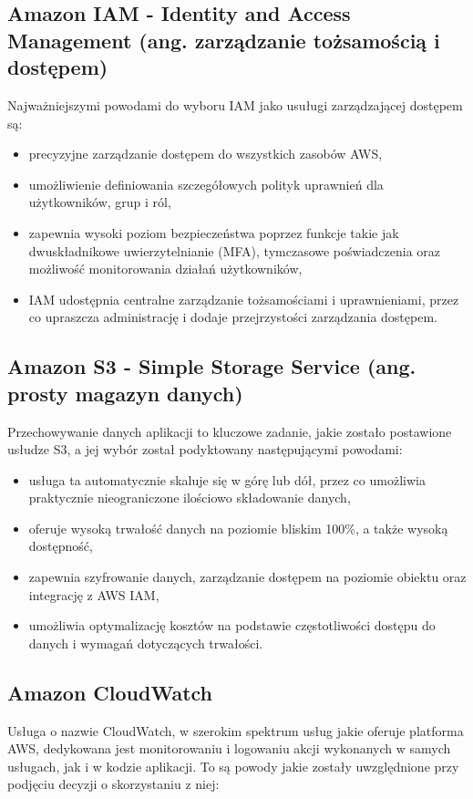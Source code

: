 \documentclass[12pt,twoside]{book}
\begin{document}
\subsection{Amazon IAM - Identity and Access Management (ang. zarządzanie tożsamością i dostępem)}
Najważniejszymi powodami do wyboru IAM jako usuługi zarządzającej dostępem są:

\begin{itemize}
\item precyzyjne zarządzanie dostępem do wszystkich zasobów AWS,
\item umożliwienie definiowania szczegółowych polityk uprawnień dla użytkowników, grup i ról,
\item zapewnia wysoki poziom bezpieczeństwa poprzez funkcje takie jak dwuskładnikowe uwierzytelnianie (MFA), tymczasowe poświadczenia oraz możliwość monitorowania działań użytkowników,
\item IAM udostępnia centralne zarządzanie tożsamościami i uprawnieniami, przez co upraszcza administrację i dodaje przejrzystości zarządzania dostępem. \cite{aws.iam}
\end{itemize}

\subsection{Amazon S3 - Simple Storage Service (ang. prosty magazyn danych)}
Przechowywanie danych aplikacji to kluczowe zadanie, jakie zostało postawione usłudze S3, a jej wybór został podyktowany następującymi powodami:

\begin{itemize}
\item usługa ta automatycznie skaluje się w górę lub dół, przez co umożliwia praktycznie nieograniczone ilościowo składowanie danych,
\item oferuje wysoką trwałość danych na poziomie bliskim 100\%, a także wysoką dostępność,
\item zapewnia szyfrowanie danych, zarządzanie dostępem na poziomie obiektu oraz integrację z AWS IAM,
\item umożliwia optymalizację kosztów na podstawie częstotliwości dostępu do danych i wymagań dotyczących trwałości. \cite{aws.s3}
\end{itemize}

\subsection{Amazon CloudWatch}
Usługa o nazwie CloudWatch, w szerokim spektrum usług jakie oferuje platforma AWS, dedykowana jest monitorowaniu i logowaniu akcji wykonanych w samych usługach, jak i w kodzie aplikacji. To są powody jakie zostały uwzględnione przy podjęciu decyzji o skorzystaniu z niej:
\end{document}
